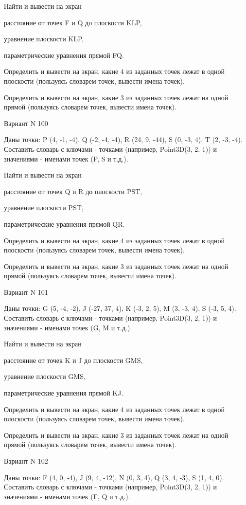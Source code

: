 \documentclass[11pt]{report}
\begin{document}
 
Найти и вывести на экран


расстояние от точек F и Q до плоскости KLP,

 
уравнение плоскости KLP,

 
параметрические уравнения прямой FQ.


Определить и вывести на экран, какие 4 из заданных точек лежат в одной плоскости (пользуясь словарем точек, вывести имена точек).


Определить и вывести на экран, какие 3 из заданных точек лежат на одной прямой (пользуясь словарем точек, вывести имена точек).

Вариант N 100

Даны точки: P (4, -1, -4), Q (-2, -4, -4), R (24, 9, -44), S (0, -3, 4), T (2, -3, -4).
Составить словарь с ключами - точками (например, Point3D(3, 2, 1)) и значениями - именами точек (P, S и т.д.).

 
Найти и вывести на экран


расстояние от точек Q и R до плоскости PST,

 
уравнение плоскости PST,

 
параметрические уравнения прямой QR.


Определить и вывести на экран, какие 4 из заданных точек лежат в одной плоскости (пользуясь словарем точек, вывести имена точек).


Определить и вывести на экран, какие 3 из заданных точек лежат на одной прямой (пользуясь словарем точек, вывести имена точек).

Вариант N 101

Даны точки: G (5, -4, -2), J (-27, 37, 4), K (-3, 2, 5), M (3, -3, 4), S (-3, 5, 4).
Составить словарь с ключами - точками (например, Point3D(3, 2, 1)) и значениями - именами точек (G, M и т.д.).

 
Найти и вывести на экран


расстояние от точек K и J до плоскости GMS,

 
уравнение плоскости GMS,

 
параметрические уравнения прямой KJ.


Определить и вывести на экран, какие 4 из заданных точек лежат в одной плоскости (пользуясь словарем точек, вывести имена точек).


Определить и вывести на экран, какие 3 из заданных точек лежат на одной прямой (пользуясь словарем точек, вывести имена точек).

Вариант N 102

Даны точки: F (4, 0, -4), J (9, 4, -12), N (0, 3, 4), Q (3, 4, -3), S (1, 4, 0).
Составить словарь с ключами - точками (например, Point3D(3, 2, 1)) и значениями - именами точек (F, Q и т.д.).
\end{document}
